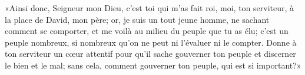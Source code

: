 «Ainsi donc, Seigneur mon Dieu, c’est toi qui m’as fait roi,
	moi, ton serviteur, à la place de David, mon père;
	or, je suis un tout jeune homme, ne sachant comment se comporter,
	et me voilà au milieu du peuple que tu as élu;
	c’est un peuple nombreux, si nombreux qu’on ne peut ni l’évaluer ni le compter.
Donne à ton serviteur un cœur attentif
	pour qu’il sache gouverner ton peuple et discerner le bien et le mal;
	sans cela, comment gouverner ton peuple, qui est si important?»
